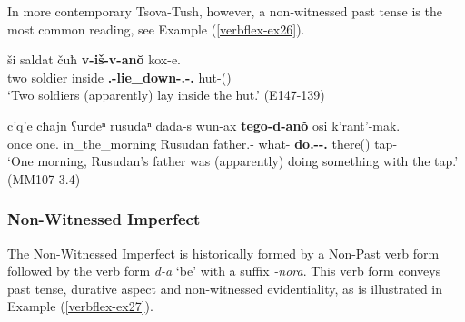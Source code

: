 In more contemporary Tsova-Tush, however, a non-witnessed past tense is the most common reading, see Example (\ref{verbflex-ex26}).

\begin{exe}
	\ex\label{verbflex-ex26}
	\begin{xlist}
		
		
			\ex\label{verbflex-ex26a}
			\gll ši saldat čuħ \textbf{v-iš-v-an\u{o}} kox-e. \\
			two soldier inside \textbf{{\M}.{\Sg}-lie\_down-{\M}.{\Sg}-{\Nw}.{\Npst}} hut-{\Obl}({\Ess}) \\
			\trans `Two soldiers (apparently) lay inside the hut.'
			\hfill (E147-139)
		
		
		
			\ex\label{verbflex-ex26b}
			\gll c'q'e cħajn ʕurdeⁿ rusudaⁿ dada-s wun-ax \textbf{tego-d-an\u{o}} osi k'rant'-mak. \\
			once one.{\Obl} in\_the\_morning Rusudan father.{\Obl}-{\Erg} what-{\Indf} \textbf{do.{\Ipfv}-{\D}-{\Nw}.{\Npst}} there({\Ess}) tap-{\Superlat} \\
			\trans `One morning, Rusudan's father was (apparently) doing something with the tap.'
			\hfill (MM107-3.4)
		
		
	\end{xlist}
\end{exe}



\subsubsection{Non-Witnessed Imperfect}

The Non-Witnessed Imperfect is historically formed by a Non-Past verb form followed by the verb form \textit{d-a} `be' with a suffix \textit{-nora}. This verb form conveys past tense, durative aspect and non-witnessed evidentiality, as is illustrated in  Example (\ref{verbflex-ex27}).


